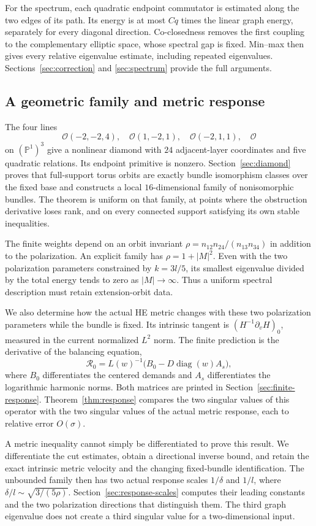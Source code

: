 \documentclass[11pt]{amsart}
\theoremstyle{definition}
\theoremstyle{remark}
\newcommand{\PP}{\mathbb P}
\newcommand{\cO}{\mathcal O}
\newcommand{\diag}{\operatorname{diag}}
\begin{document}
For the spectrum, each quadratic endpoint commutator is estimated along
the two edges of its path. Its energy is at most $Cq$ times the linear
graph energy, separately for every diagonal direction. Co-closedness
removes the first coupling to the complementary elliptic space, whose
spectral gap is fixed. Min--max then gives every relative eigenvalue
estimate, including repeated eigenvalues. Sections~\ref{sec:correction}
and \ref{sec:spectrum} provide the full arguments.

\subsection{A geometric family and metric response}
The four lines
\[
 \cO(-2,-2,4),\quad\cO(1,-2,1),\quad\cO(-2,1,1),\quad\cO
\]
on $(\PP^1)^3$ give a nonlinear diamond with $24$ adjacent-layer
coordinates and five quadratic relations. Its endpoint primitive is
nonzero. Section~\ref{sec:diamond} proves that full-support torus orbits
are exactly bundle isomorphism classes over the fixed base and constructs
a local $16$-dimensional family of nonisomorphic bundles. The theorem is
uniform on that family, at points where the obstruction derivative loses
rank, and on every connected support satisfying its own stable inequalities.

The finite weights depend on an orbit invariant
$\rho=n_{12}n_{24}/(n_{13}n_{34})$ in addition to the polarization.
An explicit family has $\rho=1+|M|^2$. Even with the two polarization
parameters constrained by $k=3l/5$, its smallest eigenvalue divided by
the total energy tends to zero as $|M|\to\infty$. Thus a uniform
spectral description must retain extension-orbit data.

We also determine how the actual HE metric changes with these two
polarization parameters while the bundle is fixed. Its intrinsic tangent
is $(H^{-1}\partial_vH)_0$, measured in the current normalized $L^2$
norm. The finite prediction is the derivative of the balancing equation,
\[
 \mathcal R_0=L(w)^{-1}\bigl(B_0-D\diag(w)A_s\bigr),
\]
where $B_0$ differentiates the centered demands and $A_s$ differentiates
the logarithmic harmonic norms. Both matrices are printed in
Section~\ref{sec:finite-response}. Theorem~\ref{thm:response} compares
the two singular values of this operator with the two singular values of
the actual metric response, each to relative error $O(\sigma)$.

A metric inequality cannot simply be differentiated to prove this result.
We differentiate the cut estimates, obtain a directional inverse bound,
and retain the exact intrinsic metric velocity and the changing
fixed-bundle identification. The unbounded family then has two actual
response scales $1/\delta$ and $1/l$, where
$\delta/l\sim\sqrt{3/(5\rho)}$. Section~\ref{sec:response-scales}
computes their leading constants and the two polarization directions that
distinguish them. The third graph eigenvalue does not create a third
singular value for a two-dimensional input.
\end{document}
